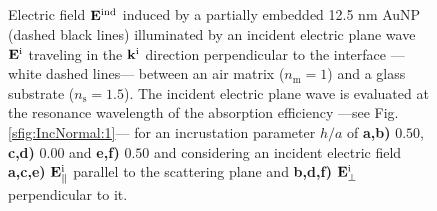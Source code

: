 \begin{figure}[h!]\centering
   \def\svgwidth{.75\textwidth}
   \footnotesize
   \\[-47.5em]
   \hspace*{-.25\textwidth}
       \begin{subfigure}{.25\textwidth}\textcolor{red}{\caption{ } \label{sfig:Near:IncNorm:50:par}}\end{subfigure}%
       \begin{subfigure}{.34\textwidth}\caption{ }\label{sfig:Near:IncNorm:50:perp}\end{subfigure}\\[13em]
    \hspace*{-.25\textwidth}
        \begin{subfigure}{.25\textwidth}\textcolor{red}{\caption{ }\label{sfig:Near:IncNorm:00:par}}\end{subfigure}%
        \begin{subfigure}{.34\textwidth}\caption{ }\label{sfig:Near:IncNorm:00:perp}\end{subfigure}\\[13em]
   \hspace*{-.25\textwidth}
       \begin{subfigure}{.25\textwidth}\caption{ } \label{sfig:Near:IncNorm:-5:par}\end{subfigure}%
       \begin{subfigure}{.34\textwidth}\caption{ }\label{sfig:Near:IncNorm:-5:perp}\end{subfigure}\\[15em]
   \caption[Induced Electric Field of a 12.5 nm Au Spherical NP embbeded into (supported on) a substrate illuminated at a normal incidence]{
       Electric field $\vb{E}^\text{ind}$ induced by a partially embedded 12.5 nm AuNP (dashed black lines) illuminated by an incident electric plane wave $\vb{E}^\text{i}$ traveling in the $\vb{k}^\text{i}$ direction perpendicular to the interface ---white dashed lines--- between an air matrix ($n_\text{m} = 1$) and a glass substrate ($n_\text{s} = 1.5$). The incident electric plane wave is evaluated at the resonance wavelength of the absorption efficiency ---see Fig. \ref{sfig:IncNormal:1}--- for an incrustation parameter $h/a$ of \textbf{a,b)} $0.50$, \textbf{c,d)} $0.00$ and \textbf{e,f)} $0.50$ and considering an incident electric field \textbf{a,c,e)} $\vb{E}^\text{i}_\parallel$ parallel to the scattering plane and \textbf{b,d,f)} $\vb{E}^\text{i}_\perp$ perpendicular to it.
   }
   \label{fig:Near:IncNorm}
 \end{figure}

